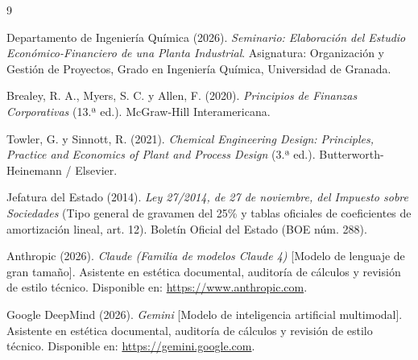 \documentclass[a4paper,11pt]{report}
\begin{document}
\begin{thebibliography}{9}

Departamento de Ingeniería Química (2026). \textit{Seminario: Elaboración del Estudio Económico-Financiero de una Planta Industrial}. Asignatura: Organización y Gestión de Proyectos, Grado en Ingeniería Química, Universidad de Granada.

Brealey, R. A., Myers, S. C. y Allen, F. (2020). \textit{Principios de Finanzas Corporativas} (13.ª ed.). McGraw-Hill Interamericana.

Towler, G. y Sinnott, R. (2021). \textit{Chemical Engineering Design: Principles, Practice and Economics of Plant and Process Design} (3.ª ed.). Butterworth-Heinemann / Elsevier.

Jefatura del Estado (2014). \textit{Ley 27/2014, de 27 de noviembre, del Impuesto sobre Sociedades} (Tipo general de gravamen del 25\% y tablas oficiales de coeficientes de amortización lineal, art. 12). Boletín Oficial del Estado (BOE núm. 288).

Anthropic (2026). \textit{Claude (Familia de modelos Claude 4)} [Modelo de lenguaje de gran tamaño]. Asistente en estética documental, auditoría de cálculos y revisión de estilo técnico. Disponible en: \url{https://www.anthropic.com}.

Google DeepMind (2026). \textit{Gemini} [Modelo de inteligencia artificial multimodal]. Asistente en estética documental, auditoría de cálculos y revisión de estilo técnico. Disponible en: \url{https://gemini.google.com}.

\end{thebibliography}
\end{document}
